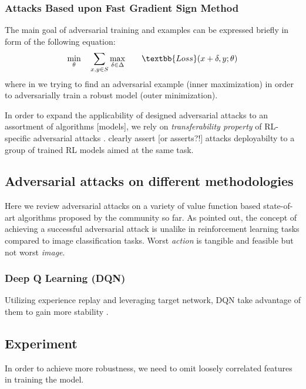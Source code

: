 \documentclass[letterpaper,12pt]{article}
\begin{document}
\subsubsection{Attacks Based upon Fast Gradient Sign Method}



The main goal of adversarial training and examples can be expressed briefly in form of the following equation:
\begin{equation*}
\begin{aligned}
& \underset{\theta}{\min}
& & \sum_{x,y \in S} \underset{\delta \in \Delta}{\max}
& & & \textbb{Loss}(x + \delta, y; \theta)
\end{aligned}
\end{equation*}
where in we trying to find an adversarial example (inner maximization) in order to adversarially train a robust model (outer minimization).


In order to expand the applicability of designed adversarial attacks to an assortment of algorithms [models], we rely on \textit{transferability property} of RL-specific adversarial attacks \cite{Szegedy2014, Papernot2016, Goodfellow2014a}. \citet{Huang2017} clearly assert [or asserts?!] attacks deployabilty to a group of trained RL models aimed at the same task.  

\subsection{Adversarial attacks on different methodologies}
Here we review adversarial attacks on a variety of value function based state-of-art algorithms proposed by the community so far. As \citet{Pattanaik2018} pointed out, the concept of achieving a successful adversarial attack is unalike in reinforcement learning tasks compared to image classification tasks. Worst \textit{action} is tangible and feasible but not worst \textit{image}.

\subsubsection{Deep Q Learning (DQN)}
Utilizing experience replay and leveraging target network, DQN take advantage of them to gain more stability \cite{Pattanaik2018}.

\subsection{Experiment}
In order to achieve more robustness, we need to omit loosely correlated features in training the model.
\end{document}
